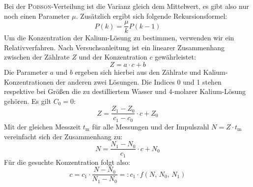 \documentclass[a4paper,12pt]{article}
\begin{document}
Bei der \textsc{Poisson}-Verteilung ist die Varianz gleich dem Mittelwert, es gibt also nur noch einen Parameter $\mu$. Zusätzlich ergibt sich folgende Rekursionsformel:
$$P(k)=\frac{\mu}{k}P(k-1)$$
Um die Konzentration der Kalium-Lösung zu bestimmen, verwenden wir ein Relativverfahren. Nach Versuchsanleitung ist ein linearer Zusammenhang zwischen der Zählrate $Z$ und der Konzentration $c$ gewährleistet:
$$Z=a\cdot c+b$$
Die Parameter $a$ und $b$ ergeben sich hierbei aus den Zählrate und Kalium-Konzentrationen der anderen zwei Lösungen. Die Indices 0 und 1 stehen respektive bei Größen die zu destilliertem Wasser und 4-molarer Kalium-Lösung gehören. Es gilt $C_0=0$:
$$Z=\frac{Z_1-Z_0}{c_1-c_0}\cdot c+Z_0$$
Mit der gleichen Messzeit $t_\mathrm{m}$ für alle Messungen und der Impulszahl $N=Z\cdot t_\mathrm{m}$ vereinfacht sich der Zusammenhang zu:
$$N=\frac{N_1-N_0}{c_1}\cdot c+N_0$$
Für die gesuchte Konzentration folgt also:
$$c=c_1\cdot\frac{N-N_0}{N_1-N_0}=:c_1\cdot f(N,\, N_0,\, N_1)$$
\end{document}
